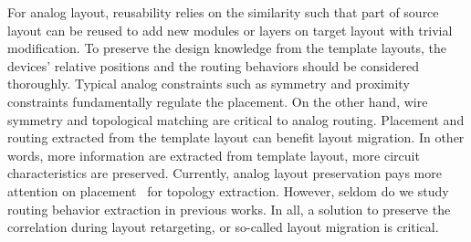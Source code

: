       For analog layout, reusability relies on the similarity such that part of source layout can be reused to add new modules or layers on target layout with trivial modification. To preserve the design knowledge from the template layouts, the devices' relative positions and the routing behaviors should be considered thoroughly. Typical analog constraints such as symmetry and proximity constraints fundamentally regulate the placement. On the other hand, wire symmetry and topological matching are critical to analog routing. Placement and routing extracted from the template layout can benefit layout migration. In other words, more information are extracted from template layout, more circuit characteristics are preserved. Currently, analog layout preservation pays more attention on placement~\cite{cart-hammouda-dac06,cbc-bhattacharya-dac04,Wang_ALRGP_TODAES2011} for topology extraction. However, seldom do we study routing behavior extraction in previous works. In all, a solution to preserve the correlation during layout retargeting, or so-called layout migration is critical.

